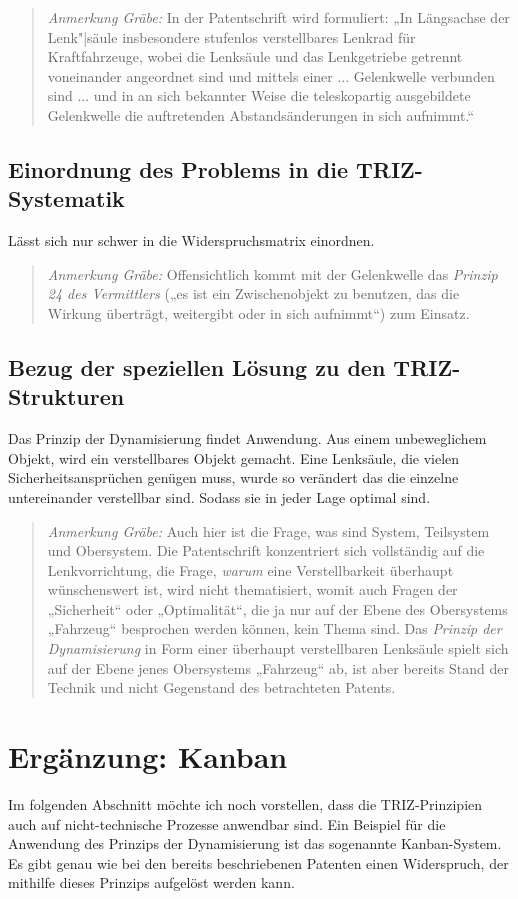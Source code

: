 \documentclass[11pt,a4paper]{article}
\newcommand{\HGG}[1]{\begin{quote} \emph{Anmerkung Gräbe:} #1  \end{quote}}
\begin{document}
\HGG{In der Patentschrift wird formuliert: „In Längsachse der Lenk"|säule
  insbesondere stufenlos verstellbares Lenkrad für Kraftfahrzeuge, wobei die
  Lenksäule und das Lenkgetriebe getrennt voneinander angeordnet sind und
  mittels einer ... Gelenkwelle verbunden sind ... und in an sich bekannter
  Weise die teleskopartig ausgebildete Gelenkwelle die auftretenden
  Abstandsänderungen in sich aufnimmt.“}

\subsection{Einordnung des Problems in die TRIZ-Systematik}
Lässt sich nur schwer in die Widerspruchsmatrix einordnen.

\HGG{Offensichtlich kommt mit der Gelenkwelle das \emph{Prinzip 24 des
    Vermittlers} („es ist ein Zwischenobjekt zu benutzen, das die Wirkung
  überträgt, weitergibt oder in sich aufnimmt“) zum Einsatz. }

\subsection{Bezug der speziellen Lösung zu den TRIZ-Strukturen}
Das Prinzip der Dynamisierung findet Anwendung. Aus einem unbeweglichem
Objekt, wird ein verstellbares Objekt gemacht. Eine Lenksäule, die vielen
Sicherheitsansprüchen genügen muss, wurde so verändert das die einzelne
untereinander verstellbar sind. Sodass sie in jeder Lage optimal sind.

\HGG{Auch hier ist die Frage, was sind System, Teilsystem und Obersystem.  Die
  Patentschrift konzentriert sich vollständig auf die Lenkvorrichtung, die
  Frage, \emph{warum} eine Verstellbarkeit überhaupt wünschenswert ist, wird
  nicht thematisiert, womit auch Fragen der „Sicherheit“ oder „Optimalität“,
  die ja nur auf der Ebene des Obersystems „Fahrzeug“ besprochen werden
  können, kein Thema sind.  Das \emph{Prinzip der Dynamisierung} in Form einer
  überhaupt verstellbaren Lenksäule spielt sich auf der Ebene jenes
  Obersystems „Fahrzeug“ ab, ist aber bereits Stand der Technik und nicht
  Gegenstand des betrachteten Patents.}

\section{Ergänzung: Kanban}
Im folgenden Abschnitt möchte ich noch vorstellen, dass die TRIZ-Prinzipien
auch auf nicht-technische Prozesse anwendbar sind. Ein Beispiel für die
Anwendung des Prinzips der Dynamisierung ist das sogenannte Kanban-System.  Es
gibt genau wie bei den bereits beschriebenen Patenten einen Widerspruch, der
mithilfe dieses Prinzips aufgelöst werden kann.
\end{document}
